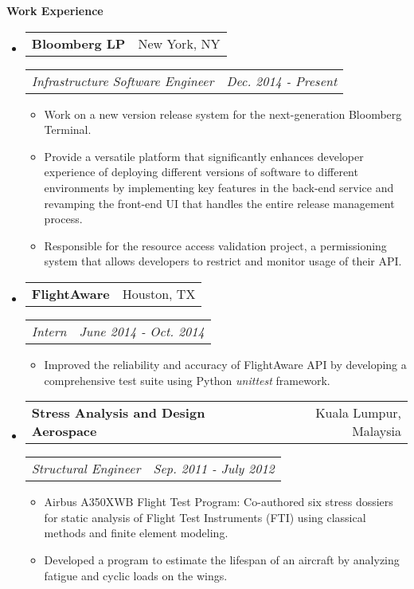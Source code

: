 \documentclass[letterpaper,11pt]{article}
\makeatletter
\newcommand{\resitem}[1]{\item #1 \vspace{-2pt}}
\newcommand{\resheading}[1]{{\begin{mdframed}[backgroundcolor=mygray]{\large \textbf{#1}}\end{mdframed}}}
\newcommand{\restitle}[2]{
\begin{tabular*}{7.0in}{l@{\extracolsep{\fill}}r}
		\textbf{#1} & #2 \\
\end{tabular*}}
\newcommand{\ressubtitle}[2]{
\begin{tabular*}{7.0in}{l@{\extracolsep{\fill}}r}
		\textit{#1} & \textit{#2} \\
\end{tabular*}\vspace{-6pt}}
\makeatother
\begin{document}
\resheading{Work Experience}
\begin{itemize}

\item
	\restitle{Bloomberg LP}{New York, NY}
	\ressubtitle{Infrastructure Software Engineer}{Dec. 2014 - Present}
	\begin{itemize}
		\resitem{Work on a new version release system for the next-generation Bloomberg Terminal.}
		\resitem{Provide a versatile platform that significantly enhances developer experience of deploying different versions of software to different environments by implementing key features in the back-end service and revamping the front-end UI that handles the entire release management process.}
		\resitem{Responsible for the resource access validation project, a permissioning system that allows developers to restrict and monitor usage of their API.}
	\end{itemize}

\item
	\restitle{FlightAware}{Houston, TX}
	\ressubtitle{Intern}{June 2014 - Oct. 2014}
	\begin{itemize}
		\resitem{Improved the reliability and accuracy of FlightAware API by developing a comprehensive test suite using Python \emph{unittest} framework.}
	\end{itemize}

\item
	\restitle{Stress Analysis and Design Aerospace}{Kuala Lumpur, Malaysia}
	\ressubtitle{Structural Engineer}{Sep. 2011 - July 2012}
	\begin{itemize}
		\resitem{Airbus A350XWB Flight Test Program: Co-authored six stress dossiers for static analysis of Flight Test Instruments (FTI) using classical methods and finite element modeling.}
		\resitem{Developed a program to estimate the lifespan of an aircraft by analyzing fatigue and cyclic loads on the wings.}
	\end{itemize}

\end{itemize}
\end{document}
